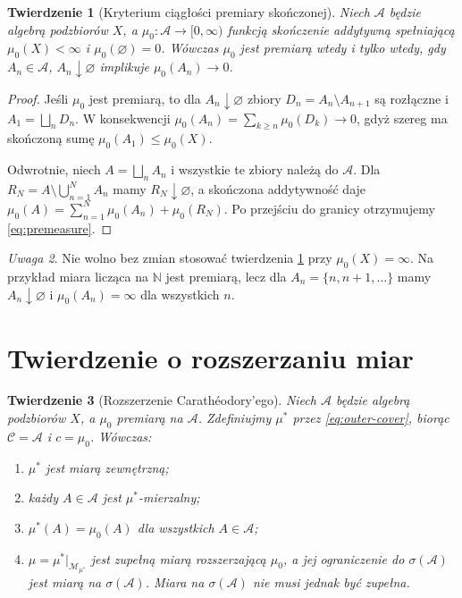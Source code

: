 \documentclass[11pt,a4paper,oneside]{book}
\numberwithin{equation}{chapter}
\theoremstyle{plain}
\newtheorem{twierdzenie}{Twierdzenie}[chapter]
\theoremstyle{definition}
\theoremstyle{remark}
\newtheorem{uwaga}[twierdzenie]{Uwaga}
\begin{document}
\begin{twierdzenie}[Kryterium ciągłości premiary skończonej]
\label{thm:premeasure-continuity}
Niech $\mathcal A$ będzie algebrą podzbiorów $X$, a
$\mu_0:\mathcal A\to[0,\infty)$ funkcją skończenie addytywną
spełniającą $\mu_0(X)<\infty$ i $\mu_0(\varnothing)=0$.
Wówczas $\mu_0$ jest premiarą wtedy i tylko wtedy, gdy
$A_n\in\mathcal A$, $A_n\downarrow\varnothing$ implikuje
$\mu_0(A_n)\to0$.
\end{twierdzenie}

\begin{proof}
Jeśli $\mu_0$ jest premiarą, to dla
$A_n\downarrow\varnothing$ zbiory $D_n=A_n\setminus A_{n+1}$
są rozłączne i $A_1=\bigsqcup_nD_n$.
W konsekwencji
$\mu_0(A_n)=\sum_{k\ge n}\mu_0(D_k)\to0$,
gdyż szereg ma skończoną sumę $\mu_0(A_1)\le\mu_0(X)$.

Odwrotnie, niech $A=\bigsqcup_n A_n$ i wszystkie te zbiory
należą do $\mathcal A$. Dla
$R_N=A\setminus\bigcup_{n=1}^N A_n$ mamy
$R_N\downarrow\varnothing$, a skończona addytywność daje
$\mu_0(A)=\sum_{n=1}^N\mu_0(A_n)+\mu_0(R_N)$.
Po przejściu do granicy otrzymujemy \eqref{eq:premeasure}.
\end{proof}

\begin{uwaga}
Nie wolno bez zmian stosować twierdzenia
\ref{thm:premeasure-continuity} przy $\mu_0(X)=\infty$.
Na przykład miara licząca na $\mathbb N$ jest premiarą,
lecz dla $A_n=\{n,n+1,\ldots\}$ mamy $A_n\downarrow\varnothing$
i $\mu_0(A_n)=\infty$ dla wszystkich $n$.
\end{uwaga}

\section{Twierdzenie o rozszerzaniu miar}

\begin{twierdzenie}[Rozszerzenie Carathéodory'ego]
\label{thm:extension-caratheodory}
Niech $\mathcal A$ będzie algebrą podzbiorów $X$, a
$\mu_0$ premiarą na $\mathcal A$. Zdefiniujmy $\mu^*$
przez \eqref{eq:outer-cover}, biorąc $\mathcal C=\mathcal A$
i $c=\mu_0$. Wówczas:
\begin{enumerate}[label=\textup{(\roman*)}]
\item $\mu^*$ jest miarą zewnętrzną;
\item każdy $A\in\mathcal A$ jest $\mu^*$-mierzalny;
\item $\mu^*(A)=\mu_0(A)$ dla wszystkich $A\in\mathcal A$;
\item $\mu=\mu^*|_{\mathcal M_{\mu^*}}$ jest zupełną miarą
rozszerzającą $\mu_0$, a jej ograniczenie do
$\sigma(\mathcal A)$ jest miarą na $\sigma(\mathcal A)$.
Miara na $\sigma(\mathcal A)$ nie musi jednak być zupełna.
\end{enumerate}
\end{twierdzenie}
\end{document}
